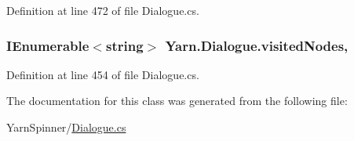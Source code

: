 Definition at line 472 of file Dialogue.\-cs.

\hypertarget{a00092_ac5661051e0b7f44527fe526c7766dbbf}{
\subsubsection[{visited\-Nodes}]{\setlength{\rightskip}{0pt plus 5cm}I\-Enumerable$<$string$>$ Yarn.\-Dialogue.\-visited\-Nodes\hspace{0.3cm}{\ttfamily [get]}, {\ttfamily [set]}}}\label{a00092_ac5661051e0b7f44527fe526c7766dbbf}


Definition at line 454 of file Dialogue.\-cs.



The documentation for this class was generated from the following file\-:\begin{DoxyCompactItemize}
\item 
Yarn\-Spinner/\hyperlink{a00305}{Dialogue.\-cs}\end{DoxyCompactItemize}
